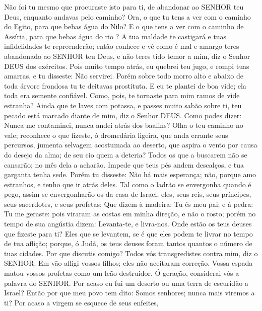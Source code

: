 {Não foi tu mesmo que procuraste isto para ti, de abandonar ao SENHOR teu Deus, enquanto andavas pelo caminho?
Ora, o que tu tens a ver
 com o caminho do Egito, para que bebas água do Nilo? E o que tens a ver com o caminho de Assíria, para que bebas água do rio
{} ?
A tua maldade te castigará e tuas infidelidades te repreenderão; então conhece e vê como é mal e amargo teres abandonado ao SENHOR teu Deus, e não teres tido temor a mim, diz o Senhor DEUS dos exércitos.
Pois muito tempo atrás, eu quebrei teu jugo, e rompi tuas amarras, e tu disseste: Não servirei. Porém sobre todo morro alto e abaixo de toda árvore frondosa tu te deitavas
{} prostituta.
E eu te plantei de boa vide; ela toda era semente confiável. Como, pois, te tornaste para mim ramos de vide estranha?
Ainda que te laves com potassa, e passes muito sabão sobre ti, teu pecado está marcado diante de mim, diz o Senhor DEUS.
Como podes dizer: Nunca me contaminei, nunca andei atrás dos baalins? Olha o teu caminho no vale; reconhece o que fizeste, ó dromedária ligeira, que anda errante seus percursos,
jumenta selvagem acostumada ao deserto, que aspira o vento por causa do desejo da alma; de seu cio quem a deteria? Todos os que a buscarem não se cansarão; no mês dela a acharão.
Impede que teus pés andem descalços, e tua garganta tenha sede. Porém tu disseste: Não há mais esperança; não, porque amo estranhos, e tenho que ir atrás deles.
Tal como o ladrão se envergonha quando é pego, assim se envergonharão os da casa de Israel; eles, seus reis, seus príncipes, seus sacerdotes, e seus profetas;
Que dizem à madeira: Tu és meu pai; e à pedra: Tu me geraste: pois viraram as costas em minha direção, e não o rosto; porém no tempo de sua angústia dizem: Levanta-te, e livra-nos.
Onde estão os teus deuses que fizeste para ti? Eles que se levantem, se é que eles podem te livrar no tempo de tua aflição; porque, ó Judá, os teus deuses foram tantos quantos o número de tuas cidades.
Por que discutis comigo? Todos vós transgredistes contra mim, diz o SENHOR.
Em vão afligi vossos filhos; eles não aceitaram correção. Vossa
{} espada matou vossos profetas como um leão destruidor.
Ó geração, considerai vós a palavra do SENHOR. Por acaso eu fui um deserto ou uma terra de escuridão a Israel? Então por que meu povo tem dito: Somos senhores; nunca mais viremos a ti?
Por acaso a virgem se esquece de seus enfeites,
}
